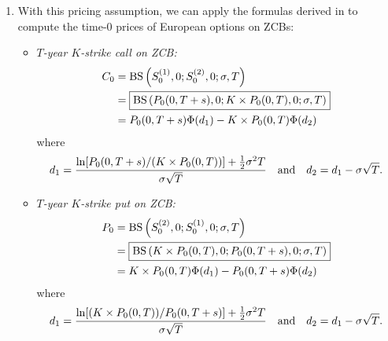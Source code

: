 \begin{enumerate}
\item \label{it:zcb-call-put-bs-pricing-fmla} With this pricing assumption, we can
apply the formulas derived in  to compute the time-0
prices of European options on ZCBs:
\begin{itemize}
\item \emph{\(T\)-year \(K\)-strike call on ZCB:}
\begin{align*}
C_0&=\operatorname{BS}\qty(S^{(1)}_{0},0;S^{(2)}_{0},0;\sigma,T) \\
&=\boxed{\operatorname{BS}\qty(P_0(0,T+s),0;K\times P_0(0,T),0;\sigma,T)} \\
&=P_0(0,T+s)\Phi(d_1)-K\times P_0(0,T)\Phi(d_2)
\end{align*}
where
\[
d_1=\frac{\ln[P_0(0,T+s)/(K\times P_0(0,T))]+\frac{1}{2}\sigma^2 T}{\sigma\sqrt{T}}
\qqtext{and}
d_2=d_1-\sigma\sqrt{T}.
\]
\item \emph{\(T\)-year \(K\)-strike put on ZCB:}
\begin{align*}
P_0&=\operatorname{BS}\qty(S^{(2)}_{0},0;S^{(1)}_{0},0;\sigma,T) \\
&=\boxed{\operatorname{BS}\qty(K\times P_0(0,T),0;P_0(0,T+s),0;\sigma,T)} \\
&=K\times P_0(0,T)\Phi(d_1)-P_0(0,T+s)\Phi(d_2)
\end{align*}
where
\[
d_1=\frac{\ln[(K\times P_0(0,T))/P_0(0,T+s)]+\frac{1}{2}\sigma^2 T}{\sigma\sqrt{T}}
\qqtext{and}
d_2=d_1-\sigma\sqrt{T}.
\]
\end{itemize}
\end{enumerate}
